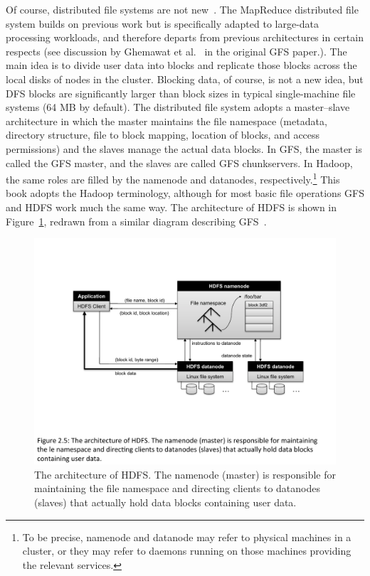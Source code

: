 Of course, distributed file systems are not
new~\cite{Howard_etal_1988,Cabrera_Long_1991,Anderson_etal_SOSP1995,Thekkath_etal_SOSP1997,Schmuck_Haskin_2002}.
The MapReduce distributed file system builds on previous work but is
specifically adapted to large-data processing workloads, and therefore
departs from previous architectures in certain respects (see
discussion by Ghemawat et al.~\cite{Ghemawat_etal_SOSP2003} in the
original GFS paper.).  The main idea is to divide user data into
blocks and replicate those blocks across the local disks of nodes in
the cluster.  Blocking data, of course, is not a new idea, but DFS
blocks are significantly larger than block sizes in typical
single-machine file systems (64 MB by default).  The distributed file
system adopts a master--slave architecture in which the master
maintains the file namespace (metadata, directory structure, file to
block mapping, location of blocks, and access permissions) and the
slaves manage the actual data blocks.  In GFS, the master is called
the GFS master, and the slaves are called GFS chunkservers.  In
Hadoop, the same roles are filled by the namenode and datanodes,
respectively.\footnote{To be precise, namenode and datanode may refer
to physical machines in a cluster, or they may refer to daemons
running on those machines providing the relevant services.} This book
adopts the Hadoop terminology, although for most basic file operations
GFS and HDFS work much the same way.  The architecture of HDFS is
shown in Figure~\ref{figure:chapter2:HDFS}, redrawn from a similar
diagram describing GFS~\cite{Ghemawat_etal_SOSP2003}.

\begin{figure}[t]
\begin{center}
\includegraphics[scale=0.6]{figures/fig-ch2-HDFS.pdf}
\end{center}
\caption{The architecture of HDFS.  The namenode (master) is responsible for maintaining the file
  namespace and directing clients to datanodes (slaves) that actually
  hold data blocks containing user data.}
\label{figure:chapter2:HDFS}
\end{figure}

